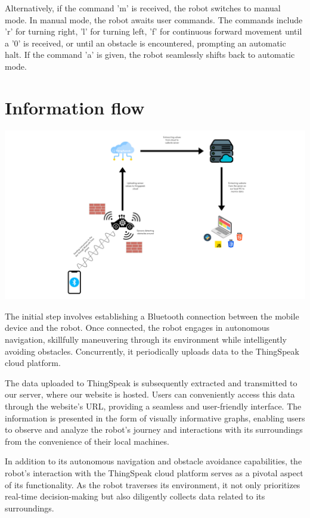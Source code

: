 \documentclass{article}
\begin{document}
    Alternatively, if the command 'm' is received, the robot switches to manual mode. In manual mode, the robot awaits user commands. The commands include 'r' for turning right, 'l' for turning left, 'f' for continuous forward movement until a '0' is received, or until an obstacle is encountered, prompting an automatic halt. If the command 'a' is given, the robot seamlessly shifts back to automatic mode.

\section{Information flow}
    \begin{center}
    \includegraphics[width=15cm]{working.pdf}
    \end{center}
    
    The initial step involves establishing a Bluetooth connection between the mobile device and the robot. Once connected, the robot engages in autonomous navigation, skillfully maneuvering through its environment while intelligently avoiding obstacles. Concurrently, it periodically uploads data to the ThingSpeak cloud platform.

    The data uploaded to ThingSpeak is subsequently extracted and transmitted to our server, where our website is hosted. Users can conveniently access this data through the website's URL, providing a seamless and user-friendly interface. The information is presented in the form of visually informative graphs, enabling users to observe and analyze the robot's journey and interactions with its surroundings from the convenience of their local machines.

    In addition to its autonomous navigation and obstacle avoidance capabilities, the robot's interaction with the ThingSpeak cloud platform serves as a pivotal aspect of its functionality. As the robot traverses its environment, it not only prioritizes real-time decision-making but also diligently collects data related to its surroundings.
\end{document}

